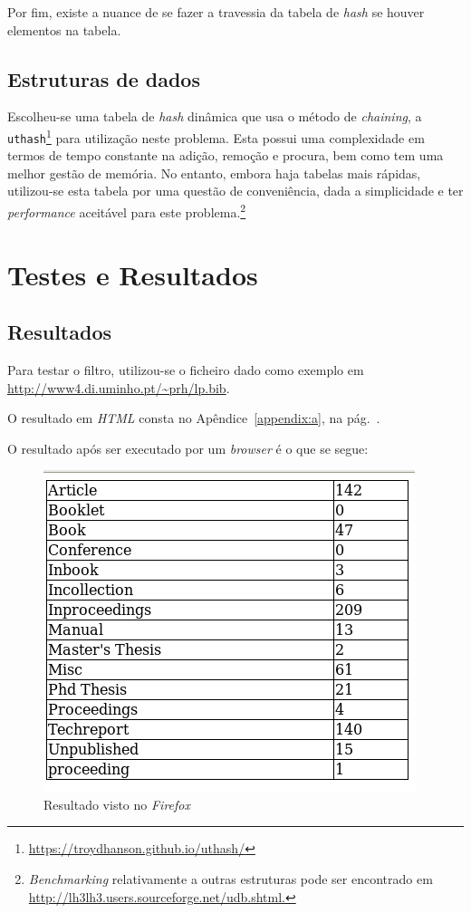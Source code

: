 Por fim, existe a nuance de se fazer a travessia da
tabela de \emph{hash} se houver elementos na tabela.


\subsection{Estruturas de dados}
\label{sec:subsec:es:a}
Escolheu-se uma tabela de \emph{hash} dinâmica que usa o método de
\emph{chaining},
a \texttt{uthash}\footnote{\url{https://troydhanson.github.io/uthash/}} para
utilização neste problema.  Esta possui uma complexidade em termos de tempo
constante na adição, remoção e procura, bem como tem uma melhor gestão de
memória. No entanto, embora haja tabelas mais rápidas, utilizou-se esta tabela
por uma questão de conveniência, dada a simplicidade e ter \emph{performance}
aceitável para este problema.\footnote{\emph{Benchmarking} relativamente
a outras estruturas pode ser encontrado em
\url{http://lh3lh3.users.sourceforge.net/udb.shtml.}}


\section{Testes e Resultados}
\label{sec:ts:a}


\subsection{Resultados}
Para testar o filtro, utilizou-se o ficheiro  dado como exemplo
em \url{http://www4.di.uminho.pt/~prh/lp.bib}.

O resultado em \emph{HTML} consta no Apêndice~\ref{appendix:a}, na
pág.~\pageref{appendix:a}.

O resultado após ser executado por um \emph{browser} é o que se segue:

\begin{figure}[h!]
	\centering
	\includegraphics[scale=0.5]{./testes/res_html}
	\caption{Resultado visto no \emph{Firefox}}
	\label{fig:res1}
\end{figure}

